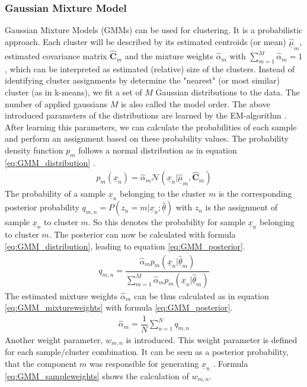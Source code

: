 \documentclass[12pt,DIV14,BCOR12mm,a4paper,footexclude,headinclude,halfparskip-,twoside,openright,cleardoubleempty,idxtotoc,bibtotoc,listtotoc]{scrreprt} %
\numberwithin{equation}{chapter}
\begin{document}
\subsubsection{Gaussian Mixture Model}
Gaussian Mixture Models (GMMs) can be used for clustering. It is a probabilistic approach. Each cluster will be described by its estimated centroids (or mean) $\hat{\underline{\mu}}_m$, estimated covariance matrix $\hat{\mathbf{C}}_m$ and the mixture weights $\hat{\alpha}_m$ with $\sum_{m=1}^{M}\hat{\alpha}_m=1$, which can be interpreted as estimated (relative) size of the clusters. Instead of identifying cluster assignments by determine the "nearest" (or most similar) cluster (as in k-means), we fit a set of $M$ Gaussian distributions to the data. The number of applied gaussians $M$ is also called the model order. The above introduced parameters of the distributions are learned by the EM-algorithm \cite{Dempster-et-al-1977}. After learning this parameters, we can calculate the probabilities of each sample and perform an assignment based on these probability values. The probability density function $p_m$ follows a normal distribution as in equation \ref{eq:GMM_distribution} \cite{Bishop}.
\begin{align}
	p_m(\underline{x}_n) = \hat{\alpha}_m\mathcal{N}(\underline{x}_n|\hat{\underline{\mu}}_m, \hat{\mathbf{C}}_m)\label{eq:GMM_distribution}
\end{align}
The probability of a sample $\underline{x}_n$ belonging to the cluster $m$ is the corresponding posterior probability $q_{m,n} = P(z_n = m|\underline{x}_n;\hat{\underline{\theta}})$ with $z_n$ is the assignment of sample $\underline{x}_n$ to cluster $m$. So this denotes the probability for sample $\underline{x}_n$ belonging to cluster $m$. The posterior can now be calculated with formula \ref{eq:GMM_distribution}, leading to equation \ref{eq:GMM_posterior}.
\begin{align}
	q_{m,n} = \dfrac{\hat{\alpha}_mp_m(\underline{x}_n|\hat{\underline{\theta}}_m)}{\sum_{m=1}^{M}\hat{\alpha}_mp_m(\underline{x}_n|\hat{\underline{\theta}}_m)}\label{eq:GMM_posterior}
\end{align}
The estimated mixture weights $\hat{\alpha}_m$ can be thus calculated as in equation \ref{eq:GMM_mixtureweights} with formula \ref{eq:GMM_posterior}.
\begin{align}
	\hat{\alpha}_m = \dfrac{1}{N}\sum_{n=1}^{N}q_{m,n}\label{eq:GMM_mixtureweights}
\end{align}
Another weight parameter, $w_{m,n}$ is introduced. This weight parameter is defined for each sample/cluster combination. It can be seen as a posterior probability, that the component $m$ was responsible for generating $\underline{x}_n$ \cite{Bishop}. Formula \ref{eq:GMM_sampleweights} shows the calculation of $w_{m,n}$.
\end{document}
